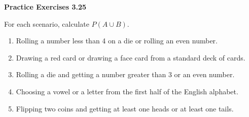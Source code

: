 \vspace{0.3ex}
\noindent\textbf{Practice Exercises 3.25}

\vspace{0.2ex}

For each scenario, calculate \( P(A \cup B) \).

\begin{enumerate}[label=\color{blue}\arabic*.]
    \item Rolling a number less than 4 on a die or rolling an even number.
    \item Drawing a red card or drawing a face card from a standard deck of cards.
    \item Rolling a die and getting a number greater than 3 or an even number.
    \item Choosing a vowel or a letter from the first half of the English alphabet.
    \item Flipping two coins and getting at least one heads or at least one tails.
    
\end{enumerate}

